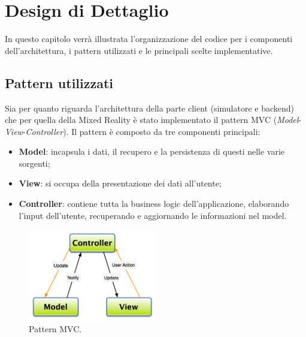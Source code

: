 
\chapter{Design di Dettaglio}
\label{chap:detailed-design}
In questo capitolo verrà illustrata l'organizzazione del codice per i componenti dell'architettura, i pattern utilizzati e le principali scelte implementative.

\section{Pattern utilizzati}
Sia per quanto riguarda l'architettura della parte client (simulatore e backend) che per quella della Mixed Reality è stato implementato il pattern MVC (\textit{Model}-\textit{View}-\textit{Controller}). Il pattern è composto da tre componenti principali:

\begin{itemize}
    \item \textbf{Model}: incapsula i dati, il recupero e la persistenza di questi nelle varie sorgenti;
    \item \textbf{View}: si occupa della presentazione dei dati all'utente;
    \item \textbf{Controller}: contiene tutta la business logic dell'applicazione, elaborando l'input dell'utente, recuperando e aggiornando le informazioni nel model.
\end{itemize}

\begin{figure}
    \centering
    \includegraphics[width=0.5\textwidth]{Images/mvcPattern.png}
    \caption{\label{pic:mvc-pattern} Pattern MVC.}
\end{figure}

